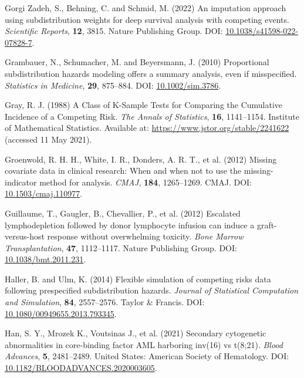 \documentclass[
  letterpaper,
  DIV=11,
  numbers=noendperiod]{scrreprt}
\newlength{\cslhangindent}
\newenvironment{CSLReferences}[2] %
 {\begin{list}{}{%
  \setlength{\itemindent}{0pt}
  \setlength{\leftmargin}{0pt}
  \setlength{\parsep}{0pt}
  \ifodd #1
   \setlength{\leftmargin}{\cslhangindent}
   \setlength{\itemindent}{-1\cslhangindent}
  \fi
  \setlength{\itemsep}{#2\baselineskip}}}
 {\end{list}}
\begin{document}
\begin{CSLReferences}{1}{1}
Gorgi Zadeh, S., Behning, C. and Schmid, M. (2022) An imputation
approach using subdistribution weights for deep survival analysis with
competing events. \emph{Scientific Reports}, \textbf{12}, 3815. Nature
Publishing Group. DOI:
\href{https://doi.org/10.1038/s41598-022-07828-7}{10.1038/s41598-022-07828-7}.

Grambauer, N., Schumacher, M. and Beyersmann, J. (2010) Proportional
subdistribution hazards modeling offers a summary analysis, even if
misspecified. \emph{Statistics in Medicine}, \textbf{29}, 875--884. DOI:
\href{https://doi.org/10.1002/sim.3786}{10.1002/sim.3786}.

Gray, R. J. (1988) A {Class} of {K-Sample Tests} for {Comparing} the
{Cumulative Incidence} of a {Competing Risk}. \emph{The Annals of
Statistics}, \textbf{16}, 1141--1154. Institute of Mathematical
Statistics. Available at: \url{https://www.jstor.org/stable/2241622}
(accessed 11 May 2021).

Groenwold, R. H. H., White, I. R., Donders, A. R. T., et al. (2012)
Missing covariate data in clinical research: When and when not to use
the missing-indicator method for analysis. \emph{CMAJ}, \textbf{184},
1265--1269. CMAJ. DOI:
\href{https://doi.org/10.1503/cmaj.110977}{10.1503/cmaj.110977}.

Guillaume, T., Gaugler, B., Chevallier, P., et al. (2012) Escalated
lymphodepletion followed by donor lymphocyte infusion can induce a
graft-versus-host response without overwhelming toxicity. \emph{Bone
Marrow Transplantation}, \textbf{47}, 1112--1117. Nature Publishing
Group. DOI:
\href{https://doi.org/10.1038/bmt.2011.231}{10.1038/bmt.2011.231}.

Haller, B. and Ulm, K. (2014) Flexible simulation of competing risks
data following prespecified subdistribution hazards. \emph{Journal of
Statistical Computation and Simulation}, \textbf{84}, 2557--2576. Taylor
\& Francis. DOI:
\href{https://doi.org/10.1080/00949655.2013.793345}{10.1080/00949655.2013.793345}.

Han, S. Y., Mrozek K., Voutsinas J., et al. (2021) Secondary cytogenetic
abnormalities in core-binding factor {AML} harboring inv(16) vs t(8;21).
\emph{Blood Advances}, \textbf{5}, 2481--2489. United States: American
Society of Hematology. DOI:
\href{https://doi.org/10.1182/BLOODADVANCES.2020003605}{10.1182/BLOODADVANCES.2020003605}.


\end{CSLReferences}
\end{document}
